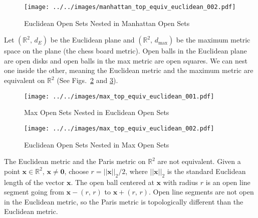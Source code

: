 \documentclass{article}
\theoremstyle{plain}
\theoremstyle{normal}
\newenvironment{example}{%
    \pushQED{\qed}\renewcommand{\qedsymbol}{$\blacksquare$}\examplex%
}{%
    \popQED\endexamplex%
}
\begin{document}
        \begin{figure}
            \centering
            \texttt{[image: ../../images/manhattan\_top\_equiv\_euclidean\_002.pdf]}
            \caption{Euclidean Open Sets Nested in Manhattan Open Sets}
            \label{fig:manhattan_top_equiv_euclidean_002}
        \end{figure}
        \begin{example}
            Let $(\mathbb{R}^{2},\,d_{E})$ be the Euclidean plane and
            $(\mathbb{R}^{2},\,d_{\textrm{max}})$ be the maximum metric space
            on the plane (the chess board metric). Open balls in the Euclidean
            plane are open disks and open balls in the max metric are open
            squares. We can nest one inside the other, meaning the Euclidean
            metric and the maximum metric are equivalent on $\mathbb{R}^{2}$
            (See Figs.~\ref{fig:max_top_equiv_euclidean_001} and
            \ref{fig:max_top_equiv_euclidean_002}).
        \end{example}
        \begin{figure}
            \centering
            \texttt{[image: ../../images/max\_top\_equiv\_euclidean\_001.pdf]}
            \caption{Max Open Sets Nested in Euclidean Open Sets}
            \label{fig:max_top_equiv_euclidean_001}
        \end{figure}
        \begin{figure}
            \centering
            \texttt{[image: ../../images/max\_top\_equiv\_euclidean\_002.pdf]}
            \caption{Euclidean Open Sets Nested in Max Open Sets}
            \label{fig:max_top_equiv_euclidean_002}
        \end{figure}
        \begin{example}
            The Euclidean metric and the Paris metric on
            $\mathbb{R}^{2}$ are not equivalent. Given a point
            $\mathbf{x}\in\mathbb{R}^{2}$, $\mathbf{x}\ne\mathbf{0}$,
            choose $r=||\mathbf{x}||_{2}/2$, where $||\mathbf{x}||_{2}$ is the
            standard Euclidean length of the vector $\mathbf{x}$. The open
            ball centered at $\mathbf{x}$ with radius $r$ is an open
            line segment going from $\mathbf{x}-(r,\,r)$ to
            $\mathbf{x}+(r,\,r)$. Open line segments are not open in the
            Euclidean metric, so the Paris metric is topologically different
            than the Euclidean metric.
        \end{example}
\end{document}
